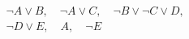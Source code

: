 \documentclass[preview,border=4pt]{standalone}
\begin{document}
\[
\begin{aligned}
        &\neg A \lor B,\quad \neg A \lor C,\quad \neg B \lor \neg C \lor D,\\
        &\neg D \lor E,\quad A,\quad \neg E
      \end{aligned}
\]
\end{document}
